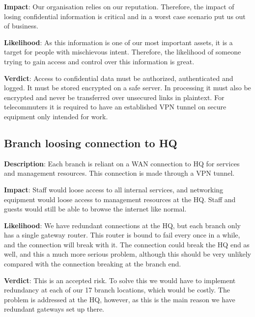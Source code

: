 \textbf{Impact}: Our organisation relies on our reputation. Therefore, the impact of losing confidential information is critical and in a worst case scenario put us out of business.

\textbf{Likelihood}: As this information is one of our most important assets, it is a target for people with mischievous intent. Therefore, the likelihood of someone trying to gain access and control over this information is great.

\textbf{Verdict}: Access to confidential data must be authorized, authenticated and logged. It must be stored encrypted on a safe server. In processing it must also be encrypted and never be transferred over unsecured links in plaintext. For telecommuters it is required to have an established VPN tunnel on secure equipment only intended for work.

%

\subsection{Branch loosing connection to HQ}

\textbf{Description}: Each branch is reliant on a WAN connection to HQ for services and management resources. This connection is made through a VPN tunnel.

\textbf{Impact}: Staff would loose access to all internal services, and networking equipment would loose access to management resources at the HQ. Staff and guests would still be able to browse the internet like normal.

\textbf{Likelihood}: We have redundant connections at the HQ, but each branch only has a single gateway router. This router is bound to fail every once in a while, and the connection will break with it. The connection could break the HQ end as well, and this a much more serious problem, although this should be very unlikely compared with the connection breaking at the branch end.

\textbf{Verdict}: This is an accepted risk. To solve this we would have to implement redundancy at each of our 17 branch locations, which would be costly. The problem is addressed at the HQ, however, as this is the main reason we have redundant gateways set up there.


